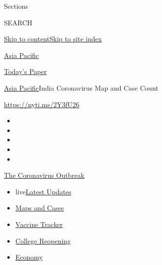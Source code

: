 Sections

SEARCH

\protect\hyperlink{site-content}{Skip to
content}\protect\hyperlink{site-index}{Skip to site index}

\href{https://www.nytimes3xbfgragh.onion/section/world/asia}{Asia
Pacific}

\href{https://myaccount.nytimes3xbfgragh.onion/auth/login?response_type=cookie\&client_id=vi}{}

\href{https://www.nytimes3xbfgragh.onion/section/todayspaper}{Today's
Paper}

\href{/section/world/asia}{Asia Pacific}\textbar{}India Coronavirus Map
and Case Count

\url{https://nyti.ms/2Y3fU26}

\begin{itemize}
\item
\item
\item
\item
\item
\end{itemize}

\href{https://www.nytimes3xbfgragh.onion/news-event/coronavirus?action=click\&pgtype=Article\&state=default\&region=TOP_BANNER\&context=storylines_menu}{The
Coronavirus Outbreak}

\begin{itemize}
\tightlist
\item
  live\href{https://www.nytimes3xbfgragh.onion/2020/08/04/world/coronavirus-covid-19.html?action=click\&pgtype=Article\&state=default\&region=TOP_BANNER\&context=storylines_menu}{Latest
  Updates}
\item
  \href{https://www.nytimes3xbfgragh.onion/interactive/2020/us/coronavirus-us-cases.html?action=click\&pgtype=Article\&state=default\&region=TOP_BANNER\&context=storylines_menu}{Maps
  and Cases}
\item
  \href{https://www.nytimes3xbfgragh.onion/interactive/2020/science/coronavirus-vaccine-tracker.html?action=click\&pgtype=Article\&state=default\&region=TOP_BANNER\&context=storylines_menu}{Vaccine
  Tracker}
\item
  \href{https://www.nytimes3xbfgragh.onion/2020/08/02/us/covid-college-reopening.html?action=click\&pgtype=Article\&state=default\&region=TOP_BANNER\&context=storylines_menu}{College
  Reopening}
\item
  \href{https://www.nytimes3xbfgragh.onion/live/2020/08/03/business/stock-market-today-coronavirus?action=click\&pgtype=Article\&state=default\&region=TOP_BANNER\&context=storylines_menu}{Economy}
\end{itemize}

